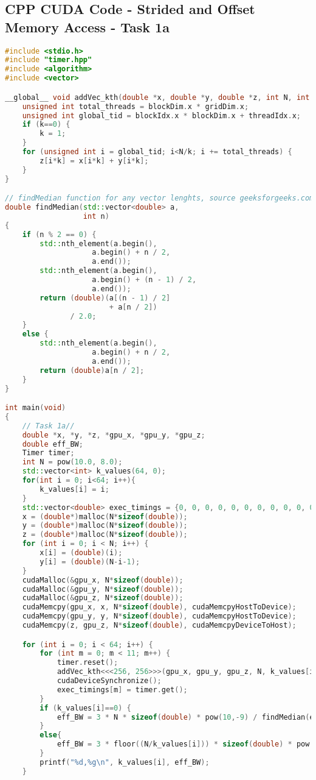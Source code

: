 \begin{appendix}
\addappheadtotoc
\section{CPP CUDA Code - Strided and Offset Memory Access - Task 1a}
\label{app_1a}

\begin{lstlisting}[language=C++, title=C++ Listing for EX1 a)]
#include <stdio.h>
#include "timer.hpp"
#include <algorithm>
#include <vector>

__global__ void addVec_kth(double *x, double *y, double *z, int N, int k) {
	unsigned int total_threads = blockDim.x * gridDim.x;
	unsigned int global_tid = blockIdx.x * blockDim.x + threadIdx.x;
	if (k==0) {
		k = 1;
	}
	for (unsigned int i = global_tid; i<N/k; i += total_threads) {
		z[i*k] = x[i*k] + y[i*k];
	}
}

// findMedian function for any vector lenghts, source geeksforgeeks.com
double findMedian(std::vector<double> a,
                  int n)
{
    if (n % 2 == 0) {
        std::nth_element(a.begin(),
                    a.begin() + n / 2,
                    a.end());
        std::nth_element(a.begin(),
                    a.begin() + (n - 1) / 2,
                    a.end());
        return (double)(a[(n - 1) / 2]
                        + a[n / 2])
               / 2.0;
    }
    else {
        std::nth_element(a.begin(),
                    a.begin() + n / 2,
                    a.end());
        return (double)a[n / 2];
    }
}

int main(void)
{
	// Task 1a//
	double *x, *y, *z, *gpu_x, *gpu_y, *gpu_z;
	double eff_BW;
	Timer timer;
	int N = pow(10.0, 8.0);
	std::vector<int> k_values(64, 0);
	for(int i = 0; i<64; i++){
		k_values[i] = i;
	}
	std::vector<double> exec_timings = {0, 0, 0, 0, 0, 0, 0, 0, 0, 0, 0};
	x = (double*)malloc(N*sizeof(double));
	y = (double*)malloc(N*sizeof(double));
	z = (double*)malloc(N*sizeof(double));
	for (int i = 0; i < N; i++) {
		x[i] = (double)(i);
		y[i] = (double)(N-i-1);
	}
	cudaMalloc(&gpu_x, N*sizeof(double)); 
	cudaMalloc(&gpu_y, N*sizeof(double));
	cudaMalloc(&gpu_z, N*sizeof(double));
	cudaMemcpy(gpu_x, x, N*sizeof(double), cudaMemcpyHostToDevice);
	cudaMemcpy(gpu_y, y, N*sizeof(double), cudaMemcpyHostToDevice);
	cudaMemcpy(z, gpu_z, N*sizeof(double), cudaMemcpyDeviceToHost);

	for (int i = 0; i < 64; i++) {
		for (int m = 0; m < 11; m++) {
			timer.reset();
			addVec_kth<<<256, 256>>>(gpu_x, gpu_y, gpu_z, N, k_values[i]);
			cudaDeviceSynchronize();
			exec_timings[m] = timer.get();
		}
		if (k_values[i]==0) {
			eff_BW = 3 * N * sizeof(double) * pow(10,-9) / findMedian(exec_timings, 10);
		}
		else{
			eff_BW = 3 * floor((N/k_values[i])) * sizeof(double) * pow(10, -9) / findMedian(exec_timings, 10);
		}
		printf("%d,%g\n", k_values[i], eff_BW);
	}


\end{lstlisting}
\end{appendix}
